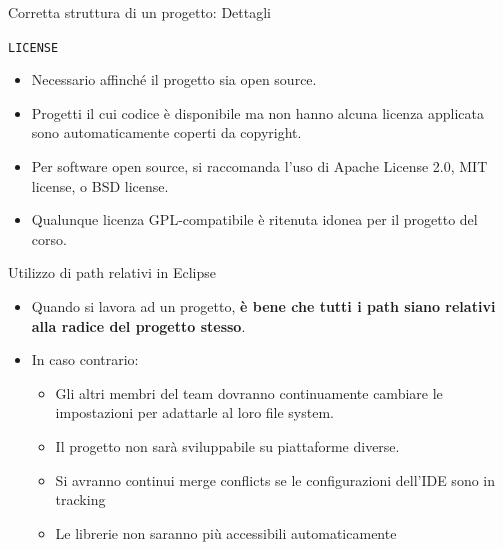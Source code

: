\documentclass[presentation]{beamer}
\begin{document}
\begin{frame}[allowframebreaks]{Corretta struttura di un progetto: Dettagli}
\begin{block}{\texttt{LICENSE}}
\begin{itemize}
			\begin{itemize}
				\item Necessario affinché il progetto sia open source.
				\item Progetti il cui codice è disponibile ma non hanno alcuna licenza applicata sono automaticamente coperti da copyright.
				\item Per software open source, si raccomanda l'uso di Apache License 2.0, MIT license, o BSD license.
				\item Qualunque licenza GPL-compatibile è ritenuta idonea per il progetto del corso.
			\end{itemize} 
		\end{itemize} 
	\end{block}
\end{frame}

\begin{frame}{Utilizzo di path relativi in Eclipse}
	\begin{itemize}\itemsep20pt
		\item Quando si lavora ad un progetto, \textbf{è bene che tutti i path siano relativi alla radice del progetto stesso}.
		\item In caso contrario:
		\begin{itemize}
			\item Gli altri membri del team dovranno continuamente cambiare le impostazioni per adattarle al loro file system.
			\item Il progetto non sarà sviluppabile su piattaforme diverse.
			\item Si avranno continui merge conflicts se le configurazioni dell'IDE sono in tracking
			\item Le librerie non saranno più accessibili automaticamente
		\end{itemize}
	\end{itemize}
\end{frame}
\end{document}
